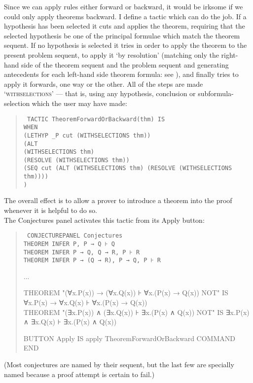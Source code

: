 Since we can apply rules either forward or backward, it would be irksome if we could only apply theorems backward. I define a tactic which can do the job. If a hypothesis has been selected it cuts and applies the theorem, requiring that the selected hypothesis be one of the principal formulae which match the theorem sequent. If no hypothesis is selected it tries in order to apply the theorem to the present problem sequent, to apply it `by resolution' (matching only the right-hand side of the theorem sequent and the problem sequent and generating antecedents for each left-hand side theorem formula: see ), and finally tries to apply it forwards, one way or the other. All of the steps are made `\textsc{withselections}' --- that is, using any hypothesis, conclusion or subformula-selection which the user may have made:
\begin{quote}\tt\small
TACTIC TheoremForwardOrBackward(thm) IS\\
\tab WHEN \\
\tab \tab (LETHYP \_P cut (WITHSELECTIONS thm))\\
\tab \tab (ALT \\
\tab \tab \tab (WITHSELECTIONS thm) \\
\tab \tab \tab (RESOLVE (WITHSELECTIONS thm)) \\
\tab \tab \tab (SEQ cut (ALT (WITHSELECTIONS thm) (RESOLVE (WITHSELECTIONS thm)))) \\
\tab \tab )
\end{quote}

The overall effect is to allow a prover to introduce a theorem into the proof whenever it is helpful to do so.\\
The Conjectures panel activates this tactic from its Apply button:
\begin{quote}\tt\small
CONJECTUREPANEL Conjectures\\
\tab THEOREM INFER P, P → Q ⊦ Q\\
\tab THEOREM INFER P → Q, Q → R, P ⊦ R\\
\tab THEOREM INFER P → (Q → R), P → Q, P ⊦ R

\tab ...

\tab THEOREM "(∀x.P(x)) → (∀x.Q(x)) ⊦ ∀x.(P(x) → Q(x)) NOT" IS ∀x.P(x) → ∀x.Q(x) ⊦ ∀x.(P(x) → Q(x))\\
\tab THEOREM "(∃x.P(x)) ∧ (∃x.Q(x)) ⊦ ∃x.(P(x) ∧ Q(x)) NOT" IS ∃x.P(x) ∧ ∃x.Q(x) ⊦ ∃x.(P(x) ∧ Q(x))

\tab BUTTON Apply IS apply TheoremForwardOrBackward COMMAND \\
END
\end{quote}
(Most conjectures are named by their sequent, but the last few are specially named because a proof attempt is certain to fail.)

